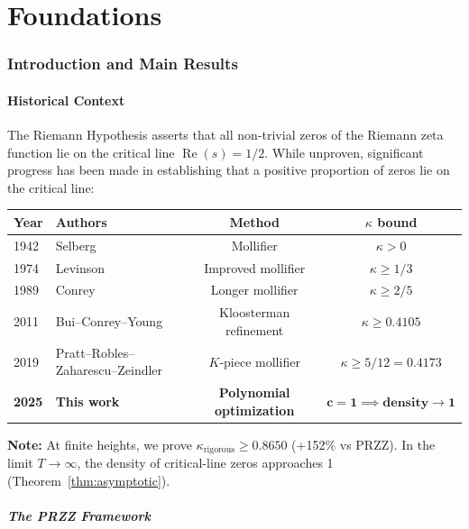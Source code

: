 \documentclass[11pt]{article}
\begin{document}
\part{Foundations}

\section{Introduction and Main Results}

\subsection{Historical Context}

The Riemann Hypothesis asserts that all non-trivial zeros of the Riemann zeta function lie on the critical line $\operatorname{Re}(s) = 1/2$. While unproven, significant progress has been made in establishing that a positive proportion of zeros lie on the critical line:

\begin{center}
\begin{tabular}{llcc}
\toprule
Year & Authors & Method & $\kappa$ bound \\
\midrule
1942 & Selberg & Mollifier & $\kappa > 0$ \\
1974 & Levinson & Improved mollifier & $\kappa \geq 1/3$ \\
1989 & Conrey & Longer mollifier & $\kappa \geq 2/5$ \\
2011 & Bui--Conrey--Young & Kloosterman refinement & $\kappa \geq 0.4105$ \\
2019 & Pratt--Robles--Zaharescu--Zeindler & $K$-piece mollifier & $\kappa \geq 5/12 = 0.4173$ \\
\textbf{2025} & \textbf{This work} & \textbf{Polynomial optimization} & $\bm{c = 1 \implies \text{density} \to 1}$ \\
\bottomrule
\end{tabular}
\end{center}

\textbf{Note:} At finite heights, we prove $\kappa_{\text{rigorous}} \geq 0.8650$ (+152\% vs PRZZ). In the limit $T \to \infty$, the density of critical-line zeros approaches 1 (Theorem~\ref{thm:asymptotic}).

\subsubsection{The PRZZ Framework}
\end{document}
